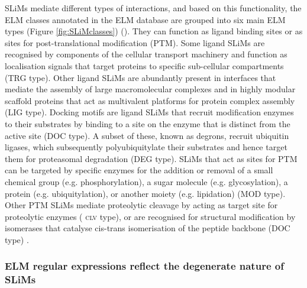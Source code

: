 \documentclass[12pt]{article}
\newcommand\motif[1]{%
    \textsc{\lowercase{#1}}%
}
\begin{document}
SLiMs mediate different types of interactions, and based on this functionality, 
the ELM classes annotated in the ELM database are grouped into six main ELM 
types (Figure \ref{fig:SLiMclasses}) (\cite{24214962}). They can function as ligand binding sites or 
as sites for post-translational modification (PTM). Some ligand SLiMs are 
recognised by components of the cellular transport machinery and function as 
localisation signals that target proteins to specific sub-cellular compartments 
(TRG type). Other ligand SLiMs are abundantly present in interfaces that mediate 
the assembly of large macromolecular complexes and in highly modular scaffold 
proteins that act as multivalent platforms for protein complex assembly 
(LIG type). Docking motifs are ligand SLiMs that recruit modification enzymes to 
their substrates by binding to a site on the enzyme that is distinct from the 
active site (DOC type). A subset of these, known as degrons, recruit ubiquitin 
ligases, which subsequently polyubiquitylate their substrates and hence target 
them for proteasomal degradation (DEG type). SLiMs that act as sites for PTM can 
be targeted by specific enzymes for the addition or removal of a small chemical 
group (e.g. phosphorylation), a sugar molecule (e.g. glycosylation), a protein 
(e.g. ubiquitylation), or another moiety (e.g. lipidation) (MOD type). Other PTM 
SLiMs mediate proteolytic cleavage by acting as target site for proteolytic 
enzymes (\motif{CLV} type), or are recognised for structural modification by isomerases 
that catalyse cis-trans isomerisation of the peptide backbone (DOC type) 
\cite{24926813, 24773235}.

\subsubsection*{ELM regular expressions reflect the degenerate nature of SLiMs}
\end{document}

